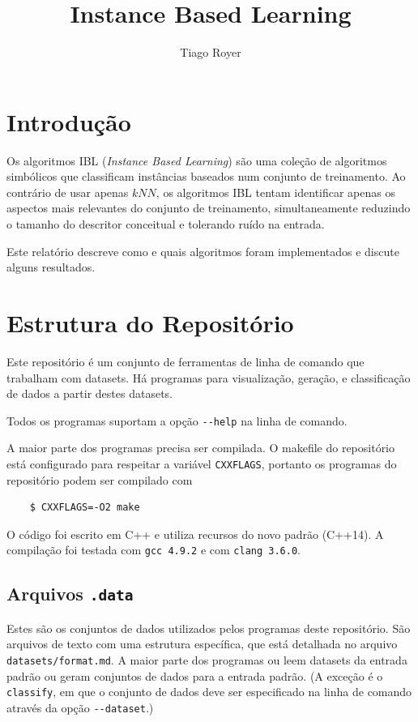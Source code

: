\documentclass{article}
\author{Tiago Royer}
\title{Instance Based Learning}
\newcommand{\kNN}{k\mathit{NN}}
\begin{document}
\maketitle

\section{Introdução}

Os algoritmos IBL (\emph{Instance Based Learning})
são uma coleção de algoritmos simbólicos
que classificam instâncias baseados num conjunto de treinamento.
Ao contrário de usar apenas $\kNN$,
os algoritmos IBL tentam identificar apenas os aspectos mais relevantes
do conjunto de treinamento,
simultaneamente reduzindo o tamanho do descritor conceitual
e tolerando ruído na entrada.

Este relatório descreve como e quais algoritmos foram implementados
e discute alguns resultados.

\section{Estrutura do Repositório}

Este repositório é um conjunto de ferramentas de linha de comando
que trabalham com datasets. Há programas para visualização,
geração, e classificação de dados a partir destes datasets.

Todos os programas suportam a opção \verb|--help| na linha de comando.

A maior parte dos programas precisa ser compilada.
O makefile do repositório está configurado
para respeitar a variável \texttt{CXXFLAGS},
portanto os programas do repositório podem ser compilado com
\begin{verbatim}
    $ CXXFLAGS=-O2 make
\end{verbatim}

O código foi escrito em C++ e utiliza recursos do novo padrão
(C++14). A compilação foi testada com \texttt{gcc 4.9.2}
e com \texttt{clang 3.6.0}.

\subsection{Arquivos \texttt{.data}}

Estes são os conjuntos de dados utilizados pelos programas deste repositório.
São arquivos de texto com uma estrutura específica,
que está detalhada no arquivo \verb|datasets/format.md|.
A maior parte dos programas ou leem datasets da entrada padrão
ou geram conjuntos de dados para a entrada padrão.
(A exceção é o \verb|classify|, em que o conjunto de dados
deve ser especificado na linha de comando através da opção \verb|--dataset|.)
\end{document}
